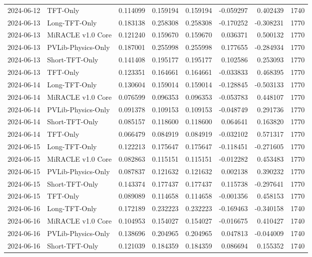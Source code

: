 \begin{tabular}{llrrrrrr}
2024-06-12 & TFT-Only & 0.114099 & 0.159194 & 0.159194 & -0.059297 & 0.402439 & 1740 \\
2024-06-13 & Long-TFT-Only & 0.183138 & 0.258308 & 0.258308 & -0.170252 & -0.308231 & 1770 \\
2024-06-13 & MiRACLE v1.0 Core & 0.121240 & 0.159670 & 0.159670 & 0.036371 & 0.500132 & 1770 \\
2024-06-13 & PVLib-Physics-Only & 0.187001 & 0.255998 & 0.255998 & 0.177655 & -0.284934 & 1770 \\
2024-06-13 & Short-TFT-Only & 0.141408 & 0.195177 & 0.195177 & 0.102586 & 0.253093 & 1770 \\
2024-06-13 & TFT-Only & 0.123351 & 0.164661 & 0.164661 & -0.033833 & 0.468395 & 1770 \\
2024-06-14 & Long-TFT-Only & 0.130604 & 0.159014 & 0.159014 & -0.128845 & -0.503133 & 1770 \\
2024-06-14 & MiRACLE v1.0 Core & 0.076599 & 0.096353 & 0.096353 & -0.053783 & 0.448107 & 1770 \\
2024-06-14 & PVLib-Physics-Only & 0.091378 & 0.109153 & 0.109153 & -0.048749 & 0.291736 & 1770 \\
2024-06-14 & Short-TFT-Only & 0.085157 & 0.118600 & 0.118600 & 0.064641 & 0.163820 & 1770 \\
2024-06-14 & TFT-Only & 0.066479 & 0.084919 & 0.084919 & -0.032102 & 0.571317 & 1770 \\
2024-06-15 & Long-TFT-Only & 0.122213 & 0.175647 & 0.175647 & -0.118451 & -0.271605 & 1770 \\
2024-06-15 & MiRACLE v1.0 Core & 0.082863 & 0.115151 & 0.115151 & -0.012282 & 0.453483 & 1770 \\
2024-06-15 & PVLib-Physics-Only & 0.087837 & 0.121632 & 0.121632 & 0.002138 & 0.390232 & 1770 \\
2024-06-15 & Short-TFT-Only & 0.143374 & 0.177437 & 0.177437 & 0.115738 & -0.297641 & 1770 \\
2024-06-15 & TFT-Only & 0.089089 & 0.114658 & 0.114658 & -0.001356 & 0.458153 & 1770 \\
2024-06-16 & Long-TFT-Only & 0.172189 & 0.232223 & 0.232223 & -0.169463 & -0.340158 & 1740 \\
2024-06-16 & MiRACLE v1.0 Core & 0.104953 & 0.154027 & 0.154027 & -0.016675 & 0.410427 & 1740 \\
2024-06-16 & PVLib-Physics-Only & 0.138696 & 0.204965 & 0.204965 & 0.047813 & -0.044009 & 1740 \\
2024-06-16 & Short-TFT-Only & 0.121039 & 0.184359 & 0.184359 & 0.086694 & 0.155352 & 1740 \\

\end{tabular}

